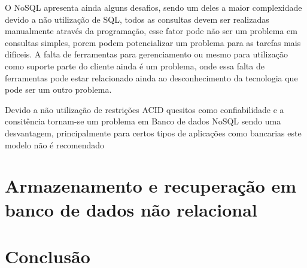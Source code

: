 \documentclass[12pt]{article}
\begin{document}
O NoSQL apresenta ainda alguns desafios, sendo um deles a maior complexidade devido a não utilização de SQL, todos as consultas devem ser realizadas manualmente através da programação, esse fator pode não ser um problema em consultas simples, porem podem potencializar um problema para as tarefas mais dificeis. A falta de ferramentas para gerenciamento ou mesmo para utilização como suporte parte do cliente ainda é um problema, onde essa falta de ferramentas pode estar relacionado ainda ao desconhecimento da tecnologia que pode ser um outro problema. \cite{leavitt:2010}

Devido a não utilização de restrições ACID quesitos como confiabilidade e a consitência tornam-se um problema em Banco de dados NoSQL sendo uma desvantagem, principalmente para certos tipos de aplicações como bancarias este modelo não é recomendado \cite{leavitt:2010}

\section{Armazenamento e recuperação em banco de dados não relacional}









\section{Conclusão}
\label{sec:conclusao}



\end{document}
